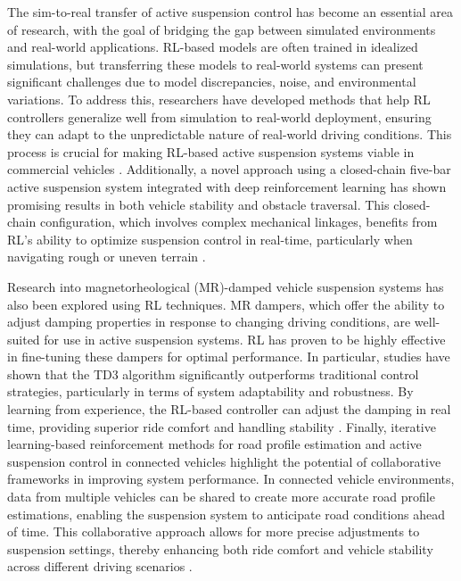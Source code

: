 The sim-to-real transfer of active suspension control has become an essential area of research, with the goal of bridging the gap between simulated environments and real-world applications. RL-based models are often trained in idealized simulations, but transferring these models to real-world systems can present significant challenges due to model discrepancies, noise, and environmental variations. To address this, researchers have developed methods that help RL controllers generalize well from simulation to real-world deployment, ensuring they can adapt to the unpredictable nature of real-world driving conditions. This process is crucial for making RL-based active suspension systems viable in commercial vehicles \cite{sim_to_real_rl}. Additionally, a novel approach using a closed-chain five-bar active suspension system integrated with deep reinforcement learning has shown promising results in both vehicle stability and obstacle traversal. This closed-chain configuration, which involves complex mechanical linkages, benefits from RL’s ability to optimize suspension control in real-time, particularly when navigating rough or uneven terrain \cite{closed_chain_rl}.

Research into magnetorheological (MR)-damped vehicle suspension systems has also been explored using RL techniques. MR dampers, which offer the ability to adjust damping properties in response to changing driving conditions, are well-suited for use in active suspension systems. RL has proven to be highly effective in fine-tuning these dampers for optimal performance. In particular, studies have shown that the TD3 algorithm significantly outperforms traditional control strategies, particularly in terms of system adaptability and robustness. By learning from experience, the RL-based controller can adjust the damping in real time, providing superior ride comfort and handling stability \cite{mr_damped_rl}. Finally, iterative learning-based reinforcement methods for road profile estimation and active suspension control in connected vehicles highlight the potential of collaborative frameworks in improving system performance. In connected vehicle environments, data from multiple vehicles can be shared to create more accurate road profile estimations, enabling the suspension system to anticipate road conditions ahead of time. This collaborative approach allows for more precise adjustments to suspension settings, thereby enhancing both ride comfort and vehicle stability across different driving scenarios \cite{iterative_learning_rl}.


	